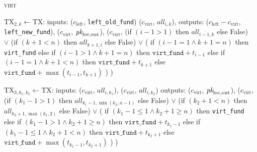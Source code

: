 \begin{processbox}{\textsc{virt}}
\begin{algorithmic}[1]
       
        \State $\mathrm{TX}_{2, k} \gets \mathrm{TX}$:
        \Indent
          \State inputs:
          \Indent
            \State ($c_{\mathrm{left}}$, \texttt{left\_old\_fund})
            \State ($c_{\mathrm{virt}}$, $\mathit{all}_{i, k}$),
          \EndIndent
          \State outputs:
          \Indent
            \State ($c_{\mathrm{left}} - c_{\mathrm{virt}}$,
            \texttt{left\_new\_fund}),
            \State ($c_{\mathrm{virt}}$, $\textit{pk}_{\mathrm{loc}, \mathrm{out}}$),
            \State ($c_{\mathrm{virt}}$,
            \Indent
              \State (if $(i-1 > 1)$ then $\mathit{all}_{i-1, k}$ else False)
              \State $\vee$ (if $(k+1 < n)$ then $\mathit{all}_{k+1, i}$ else
              False)
              \State $\vee$ (
              \Indent
                \State if $(i-1 = 1 \wedge k+1 = n)$ then \texttt{virt\_fund}
                \State else if $(i-1 > 1 \wedge k+1 = n)$ then
                $\texttt{virt\_fund} + t_{i-1}$
                \State else if $(i-1 = 1 \wedge k+1 < n)$ then
                $\texttt{virt\_fund} + t_{k+1}$
                \State else 
                $\texttt{virt\_fund} + \max{(t_{i-1}, t_{k+1})}$
              \EndIndent
              \State )
            \EndIndent
            \State )
          \EndIndent
        \EndIndent
      \EndFor

        \State $\mathrm{TX}_{3, k_1, k_2} \gets \mathrm{TX}$:
        \Indent
          \State inputs:
          \Indent
            \State ($c_{\mathrm{virt}}$, $\mathit{all}_{i, k_1}$),
            \State ($c_{\mathrm{virt}}$, $\mathit{all}_{i, k_2}$)
          \EndIndent
          \State outputs:
          \Indent
            \State ($c_{\mathrm{virt}}$, $\textit{pk}_{\mathrm{loc}, \mathrm{out}}$),
            \State ($c_{\mathrm{virt}}$,
            \Indent
              \State (if $(k_1-1 > 1)$ then $\mathit{all}_{k_1-1, \min{(k_2,
              n-1)}}$ else False)
              \State $\vee$ (if $(k_2+1 < n)$ then $\mathit{all}_{k_2+1,
              \max{(k_1, 2)}}$ else False)
              \State $\vee$ (
              \Indent
                \State if $(k_1-1 \leq 1 \wedge k_2+1 \geq n)$ then
                \texttt{virt\_fund}
                \State else if $(k_1-1 > 1 \wedge k_2+1 \geq n)$ then
                $\texttt{virt\_fund} + t_{k_1-1}$
                \State else if $(k_1-1 \leq 1 \wedge k_2+1 < n)$ then
                $\texttt{virt\_fund} + t_{k_2+1}$
                \State else 
                \Indent
                  \State $\texttt{virt\_fund} + \max{(t_{k_1-1}, t_{k_2+1})}$
                \EndIndent
              \EndIndent
              \State )
            \EndIndent
            \State )
          \EndIndent
        \EndIndent
      \EndFor


\end{algorithmic}
\end{processbox}
